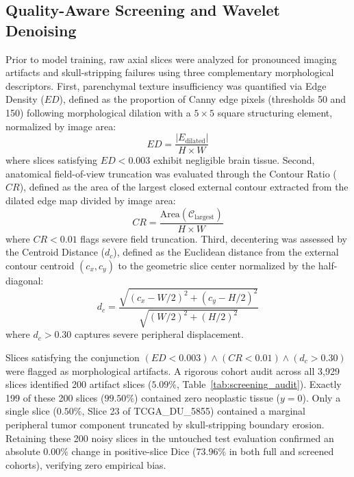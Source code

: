 \documentclass[preprint,3p,times,onecolumn]{elsarticle}
\begin{document}
\subsection{Quality-Aware Screening and Wavelet Denoising}
Prior to model training, raw axial slices were analyzed for pronounced imaging artifacts and skull-stripping failures using three complementary morphological descriptors. First, parenchymal texture insufficiency was quantified via Edge Density ($ED$), defined as the proportion of Canny edge pixels (thresholds 50 and 150) following morphological dilation with a $5 \times 5$ square structuring element, normalized by image area:
\begin{equation}
ED = \frac{|E_{\text{dilated}}|}{H \times W}
\end{equation}
where slices satisfying $ED < 0.003$ exhibit negligible brain tissue. Second, anatomical field-of-view truncation was evaluated through the Contour Ratio ($CR$), defined as the area of the largest closed external contour extracted from the dilated edge map divided by image area:
\begin{equation}
CR = \frac{\text{Area}(\mathcal{C}_{\text{largest}})}{H \times W}
\end{equation}
where $CR < 0.01$ flags severe field truncation. Third, decentering was assessed by the Centroid Distance ($d_c$), defined as the Euclidean distance from the external contour centroid $(c_x, c_y)$ to the geometric slice center normalized by the half-diagonal:
\begin{equation}
d_c = \frac{\sqrt{(c_x - W/2)^2 + (c_y - H/2)^2}}{\sqrt{(W/2)^2 + (H/2)^2}}
\end{equation}
where $d_c > 0.30$ captures severe peripheral displacement.

Slices satisfying the conjunction $(ED < 0.003) \land (CR < 0.01) \land (d_c > 0.30)$ were flagged as morphological artifacts. A rigorous cohort audit across all 3,929 slices identified 200 artifact slices ($5.09\%$, Table~\ref{tab:screening_audit}). Exactly 199 of these 200 slices ($99.50\%$) contained zero neoplastic tissue ($y = 0$). Only a single slice ($0.50\%$, Slice 23 of TCGA\_DU\_5855) contained a marginal peripheral tumor component truncated by skull-stripping boundary erosion. Retaining these 200 noisy slices in the untouched test evaluation confirmed an absolute $0.00\%$ change in positive-slice Dice ($73.96\%$ in both full and screened cohorts), verifying zero empirical bias.
\end{document}
